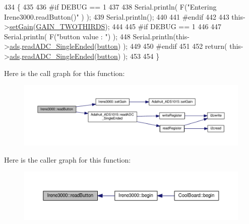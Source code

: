 \begin{DoxyCode}
434 \{
435 
436 \textcolor{preprocessor}{#if DEBUG == 1 }
437 
438     Serial.println( F(\textcolor{stringliteral}{"Entering Irene3000.readButton()"} ) );
439     Serial.println();
440 
441 \textcolor{preprocessor}{#endif }
442 
443     this->\hyperlink{class_irene3000_aff7c5da186b388e7272e63ff88a20c34}{setGain}(\hyperlink{_cool_adafruit___a_d_s1015_8h_a3d6c0e15829a207b9155890811fa4781a879d688347ec0bf159fe1278db602f68}{GAIN\_TWOTHIRDS});
444 
445 \textcolor{preprocessor}{#if DEBUG == 1}
446     
447     Serial.println( F(\textcolor{stringliteral}{"button value : "}) );
448     Serial.println(this->\hyperlink{class_irene3000_a1215e77ba761c9908d80d691f149e135}{ads}.\hyperlink{class_adafruit___a_d_s1015_a40f38b9e1f3ec397c0670dd632510235}{readADC\_SingleEnded}(\hyperlink{_irene3000_8h_a37976ee6fe1fb8546bfd6153b83ffa6c}{button}) );
449 
450 \textcolor{preprocessor}{#endif }
451 
452     \textcolor{keywordflow}{return}( this->\hyperlink{class_irene3000_a1215e77ba761c9908d80d691f149e135}{ads}.\hyperlink{class_adafruit___a_d_s1015_a40f38b9e1f3ec397c0670dd632510235}{readADC\_SingleEnded}(\hyperlink{_irene3000_8h_a37976ee6fe1fb8546bfd6153b83ffa6c}{button}) );
453     
454 \}
\end{DoxyCode}
Here is the call graph for this function\+:\nopagebreak
\begin{figure}[H]
\begin{center}
\leavevmode
\includegraphics[width=350pt]{d6/d03/class_irene3000_a78a87eb7cf295b95c12b2ebd51c2bb77_cgraph}
\end{center}
\end{figure}
Here is the caller graph for this function\+:\nopagebreak
\begin{figure}[H]
\begin{center}
\leavevmode
\includegraphics[width=350pt]{d6/d03/class_irene3000_a78a87eb7cf295b95c12b2ebd51c2bb77_icgraph}
\end{center}
\end{figure}
\mbox{\label{class_irene3000_a436fc0a06681cd0784aba56b9707f19a}} 
